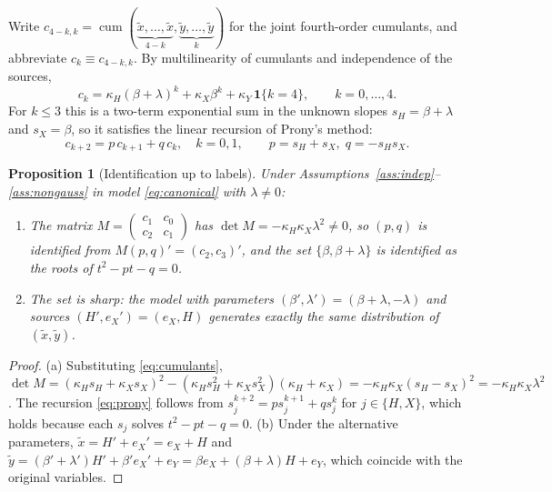 \documentclass[11pt]{article}
\newtheorem{proposition}{Proposition}
\theoremstyle{definition}
\theoremstyle{remark}
\newcommand{\cum}{\operatorname{cum}}
\newcommand{\tx}{\tilde{x}}
\newcommand{\ty}{\tilde{y}}
\begin{document}
Write $c_{4-k,k} = \cum(\underbrace{\tx,\dots,\tx}_{4-k},\underbrace{\ty,\dots,\ty}_{k})$ for the joint
fourth-order cumulants, and abbreviate $c_k \equiv c_{4-k,k}$. By multilinearity of cumulants and
independence of the sources,
\begin{equation}\label{eq:cumulants}
  c_k = \kappa_H (\beta+\lambda)^k + \kappa_X \beta^k + \kappa_Y\,\mathbf{1}\{k=4\}, \qquad k=0,\dots,4.
\end{equation}
For $k\le 3$ this is a two-term exponential sum in the unknown slopes $s_H=\beta+\lambda$ and
$s_X=\beta$, so it satisfies the linear recursion of Prony's method:
\begin{equation}\label{eq:prony}
  c_{k+2} = p\,c_{k+1} + q\,c_k,\quad k=0,1, \qquad p = s_H + s_X,\; q = -s_H s_X.
\end{equation}

\begin{proposition}[Identification up to labels]\label{prop:twopoint}
Under Assumptions~\ref{ass:indep}--\ref{ass:nongauss} in model \eqref{eq:canonical} with
$\lambda\neq0$:
\begin{enumerate}[label=(\alph*)]
  \item The matrix $M = \begin{pmatrix} c_{1} & c_{0}\\ c_{2} & c_{1}\end{pmatrix}$ has
  $\det M = -\kappa_H\kappa_X\lambda^2 \neq 0$, so $(p,q)$ is identified from
  $M(p,q)' = (c_2,c_3)'$, and the set $\{\beta,\beta+\lambda\}$ is identified as the roots of
  $t^2 - pt - q = 0$.
  \item The set is sharp: the model with parameters $(\beta',\lambda') = (\beta+\lambda,-\lambda)$ and
  sources $(H',e_X') = (e_X,H)$ generates exactly the same distribution of $(\tx,\ty)$.
\end{enumerate}
\end{proposition}

\begin{proof}
(a) Substituting \eqref{eq:cumulants},
$\det M = (\kappa_H s_H + \kappa_X s_X)^2 - (\kappa_H s_H^2 + \kappa_X s_X^2)(\kappa_H + \kappa_X)
= -\kappa_H\kappa_X (s_H - s_X)^2 = -\kappa_H\kappa_X\lambda^2$. The recursion \eqref{eq:prony}
follows from $s_j^{k+2} = p s_j^{k+1} + q s_j^{k}$ for $j\in\{H,X\}$, which holds because each $s_j$
solves $t^2 - pt - q = 0$. (b) Under the alternative parameters,
$\tx = H' + e_X' = e_X + H$ and $\ty = (\beta'+\lambda')H' + \beta' e_X' + e_Y
= \beta e_X + (\beta+\lambda)H + e_Y$, which coincide with the original variables.
\end{proof}
\end{document}
